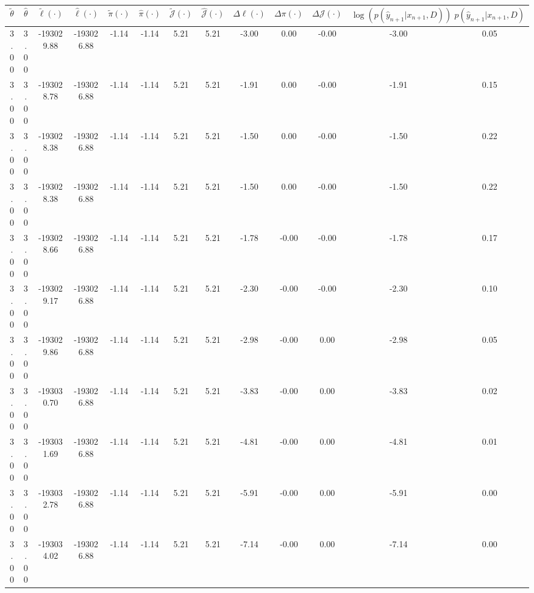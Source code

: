 \begin{table}[htbp]
        \centering
        \tiny
        \begin{adjustbox}{angle=90}
            \begin{tabular}{|c|c|c|c|c|c|c|c|c|c|c|c|c|}
                \hline
                 $\tilde{\theta}$ & $\hat{\theta}$ & $\tilde{\ell}(\cdot)$ & $\hat{\ell}(\cdot)$ & $\tilde{\pi}(\cdot)$ & $\hat{\pi}(\cdot)$ & $\tilde{\mathcal{J}}(\cdot)$ & $\hat{\mathcal{J}}(\cdot)$ & $\Delta \ell(\cdot)$ & $\Delta \pi(\cdot)$ & $\Delta \mathcal{J}(\cdot)$ & $\log(p(\hat{y}_{n+1}|x_{n+1}, D))$ & $p(\hat{y}_{n+1}|x_{n+1}, D)$ \\
                \hline
                 3.00 & 3.00 & -193029.88 & -193026.88 & -1.14 & -1.14 & 5.21 & 5.21 & -3.00 & 0.00 & -0.00 & -3.00 & 0.05\\ \hline
 3.00 & 3.00 & -193028.78 & -193026.88 & -1.14 & -1.14 & 5.21 & 5.21 & -1.91 & 0.00 & -0.00 & -1.91 & 0.15\\ \hline
 3.00 & 3.00 & -193028.38 & -193026.88 & -1.14 & -1.14 & 5.21 & 5.21 & -1.50 & 0.00 & -0.00 & -1.50 & 0.22\\ \hline
 3.00 & 3.00 & -193028.38 & -193026.88 & -1.14 & -1.14 & 5.21 & 5.21 & -1.50 & 0.00 & -0.00 & -1.50 & 0.22\\ \hline
 3.00 & 3.00 & -193028.66 & -193026.88 & -1.14 & -1.14 & 5.21 & 5.21 & -1.78 & -0.00 & -0.00 & -1.78 & 0.17\\ \hline
 3.00 & 3.00 & -193029.17 & -193026.88 & -1.14 & -1.14 & 5.21 & 5.21 & -2.30 & -0.00 & -0.00 & -2.30 & 0.10\\ \hline
 3.00 & 3.00 & -193029.86 & -193026.88 & -1.14 & -1.14 & 5.21 & 5.21 & -2.98 & -0.00 & 0.00 & -2.98 & 0.05\\ \hline
 3.00 & 3.00 & -193030.70 & -193026.88 & -1.14 & -1.14 & 5.21 & 5.21 & -3.83 & -0.00 & 0.00 & -3.83 & 0.02\\ \hline
 3.00 & 3.00 & -193031.69 & -193026.88 & -1.14 & -1.14 & 5.21 & 5.21 & -4.81 & -0.00 & 0.00 & -4.81 & 0.01\\ \hline
 3.00 & 3.00 & -193032.78 & -193026.88 & -1.14 & -1.14 & 5.21 & 5.21 & -5.91 & -0.00 & 0.00 & -5.91 & 0.00\\ \hline
 3.00 & 3.00 & -193034.02 & -193026.88 & -1.14 & -1.14 & 5.21 & 5.21 & -7.14 & -0.00 & 0.00 & -7.14 & 0.00\\ \hline
            \end{tabular}
        \end{adjustbox}
        \caption{}
        \label{}
    \end{table}
    